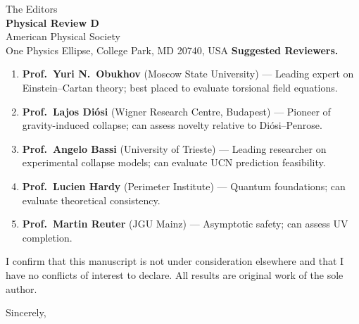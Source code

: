 \documentclass[12pt,a4paper]{letter}
\begin{document}
\begin{letter}{The Editors\\
\textbf{Physical Review D}\\
American Physical Society\\
One Physics Ellipse, College Park, MD 20740, USA}
\textbf{Suggested Reviewers.}
\begin{enumerate}
\item \textbf{Prof.\ Yuri N.\ Obukhov} (Moscow State University) --- Leading expert on
  Einstein--Cartan theory; best placed to evaluate torsional field equations.
\item \textbf{Prof.\ Lajos Di\'osi} (Wigner Research Centre, Budapest) --- Pioneer of
  gravity-induced collapse; can assess novelty relative to Di\'osi--Penrose.
\item \textbf{Prof.\ Angelo Bassi} (University of Trieste) --- Leading researcher on
  experimental collapse models; can evaluate UCN prediction feasibility.
\item \textbf{Prof.\ Lucien Hardy} (Perimeter Institute) --- Quantum foundations;
  can evaluate theoretical consistency.
\item \textbf{Prof.\ Martin Reuter} (JGU Mainz) --- Asymptotic safety; can assess UV completion.
\end{enumerate}

I confirm that this manuscript is not under consideration elsewhere and that I
have no conflicts of interest to declare. All results are original work of the sole author.

\closing{Sincerely,}


\end{letter}
\end{document}
